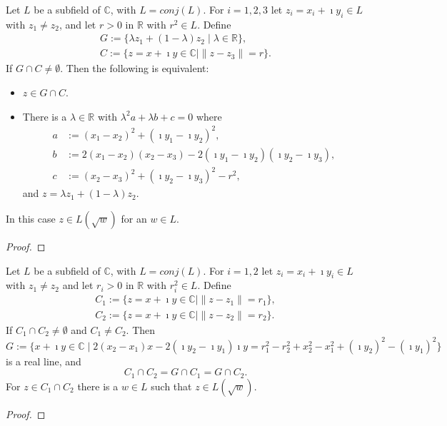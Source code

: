 \begin{lemma}
    \label{Intersection_line_circle}
    Let $L$ be a subfield of $\mathbb{C}$, with $L = conj(L)$. For $i = 1,2,3$ let $z_i = x_i + \imath y_i \in L$ with $z_1 \ne z_2$, and let $r > 0$ in $\mathbb{R}$ with $r^2 \in L$. Define
    \begin{equation*}\begin{aligned}
        G := \{\lambda z_1 + (1-\lambda)z_2 \mid \lambda \in \mathbb{R}\},\\
        C := \{z = x + \imath y \in \mathbb{C} \mid \|z - z_3\| = r\}.
    \end{aligned} \end{equation*}
    If $G \cap C \ne \emptyset$. Then the following is equivalent:
    \begin{itemize}
        \item $z\in G \cap C$.
        \item There is a $\lambda \in \mathbb{R}$ with $\lambda^2 a+ \lambda b + c = 0$ where
        \begin{align*}
            a &:= (x_1 - x_2)^2 + (\imath y_1 - \imath y_2)^2,\\
            b &:= 2(x_1 - x_2)(x_2 - x_3) - 2(\imath y_1 - \imath y_2)(\imath y_2 - \imath y_3),\\
            c &:= (x_2 - x_3)^2 + (\imath y_2 - \imath y_3)^2 - r^2,
        \end{align*}
        and $z = \lambda z_1 + (1-\lambda)z_2$.
    \end{itemize}
    In this case $z \in L(\sqrt{w})$ for an $w \in L$.
\end{lemma}

\begin{proof}
\end{proof}

\begin{lemma}
    \label{Intersection_circle_circle}
    Let $L$ be a subfield of $\mathbb{C}$, with $L = conj(L)$. For $i = 1,2 $ let $z_i = x_i + \imath y_i \in L$ with $z_1 \ne z_2$ and let $r_i > 0$ in $\mathbb{R}$ with $r_i^2 \in L$. Define
    \begin{equation*} \begin{aligned}
        C_1 := \{z = x + \imath y \in \mathbb{C} \mid \|z - z_1\| = r_1\},\\
        C_2 := \{z = x + \imath y \in \mathbb{C} \mid \|z - z_2\| = r_2\}.
    \end{aligned} \end{equation*}
    If $C_1 \cap C_2 \ne \emptyset$ and $C_1 \ne C_2$. Then 
    $$G := \{x+\imath y \in \mathbb{C} \mid 2(x_2 - x_1)x - 2(\imath y_2 - \imath y_1)\imath y = r_1^2 - r_2^2 + x_2^2 - x_1^2 + (\imath y_2)^2 - (\imath y_1)^2\} $$
    is a real line, and $$ C_1 \cap C_2 = G \cap C_1 = G \cap C_2. $$
    For $z \in C_1 \cap C_2$ there is a $w \in L$ such that $z \in L(\sqrt{w})$.
\end{lemma}
\begin{proof}
\end{proof}


